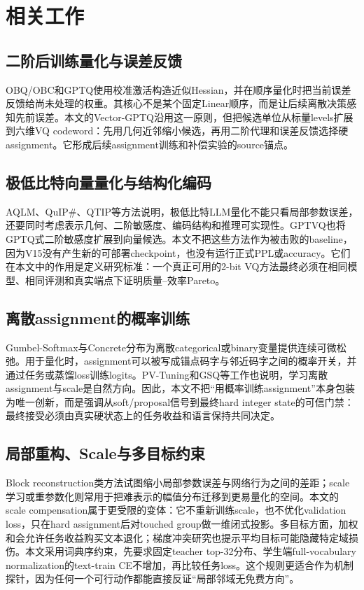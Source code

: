 \section{相关工作}

\subsection{二阶后训练量化与误差反馈}

OBQ/OBC和GPTQ使用校准激活构造近似Hessian，并在顺序量化时把当前误差反馈给尚未处理的权重\cite{obc,gptq}。其核心不是某个固定Linear顺序，而是让后续离散决策感知先前误差。本文的Vector-GPTQ沿用这一原则，但把候选单位从标量levels扩展到六维VQ codeword：先用几何近邻缩小候选，再用二阶代理和误差反馈选择硬assignment。它形成后续assignment训练和补偿实验的source锚点。

\subsection{极低比特向量量化与结构化编码}

AQLM、QuIP\#、QTIP等方法说明，极低比特LLM量化不能只看局部参数误差，还要同时考虑表示几何、二阶敏感度、编码结构和推理可实现性\cite{aqlm,quipsharp,qtip}。GPTVQ也将GPTQ式二阶敏感度扩展到向量候选\cite{gptvq}。本文不把这些方法作为被击败的baseline，因为V15没有产生新的可部署checkpoint，也没有运行正式PPL或accuracy。它们在本文中的作用是定义研究标准：一个真正可用的2-bit VQ方法最终必须在相同模型、相同评测和真实端点下证明质量--效率Pareto。

\subsection{离散assignment的概率训练}

Gumbel-Softmax与Concrete分布为离散categorical或binary变量提供连续可微松弛\cite{gumbel,concrete}。用于量化时，assignment可以被写成锚点码字与邻近码字之间的概率开关，并通过任务或蒸馏loss训练logits。PV-Tuning和GSQ等工作也说明，学习离散assignment与scale是自然方向\cite{pvtuning,gsq}。因此，本文不把“用概率训练assignment”本身包装为唯一创新，而是强调从soft/proposal信号到最终hard integer state的可信门禁：最终接受必须由真实硬状态上的任务收益和语言保持共同决定。

\subsection{局部重构、Scale与多目标约束}

Block reconstruction类方法试图缩小局部参数误差与网络行为之间的差距\cite{brecq,mrem}；scale学习或重参数化则常用于把难表示的幅值分布迁移到更易量化的空间。本文的scale compensation属于更受限的变体：它不重新训练scale，也不优化validation loss，只在hard assignment后对touched group做一维闭式投影。多目标方面，加权和会允许任务收益购买文本退化；梯度冲突研究也提示平均目标可能隐藏特定域损伤\cite{pcgrad}。本文采用词典序约束，先要求固定teacher top-32分布、学生端full-vocabulary normalization的text-train CE不增加，再比较任务loss。这个规则更适合作为机制探针，因为任何一个可行动作都能直接反证“局部邻域无免费方向”。
